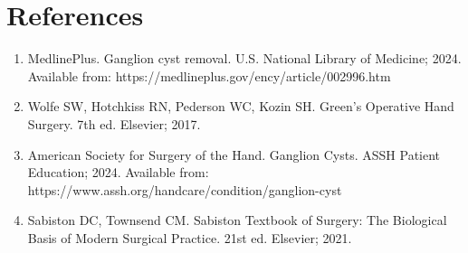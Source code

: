 \section*{References}
\begin{enumerate}
  \item MedlinePlus. Ganglion cyst removal. U.S. National Library of Medicine; 2024. Available from: https://medlineplus.gov/ency/article/002996.htm
  
  \item Wolfe SW, Hotchkiss RN, Pederson WC, Kozin SH. Green's Operative Hand Surgery. 7th ed. Elsevier; 2017.
  
  \item American Society for Surgery of the Hand. Ganglion Cysts. ASSH Patient Education; 2024. Available from: https://www.assh.org/handcare/condition/ganglion-cyst
  
  \item Sabiston DC, Townsend CM. Sabiston Textbook of Surgery: The Biological Basis of Modern Surgical Practice. 21st ed. Elsevier; 2021.
\end{enumerate}

\clearpage
